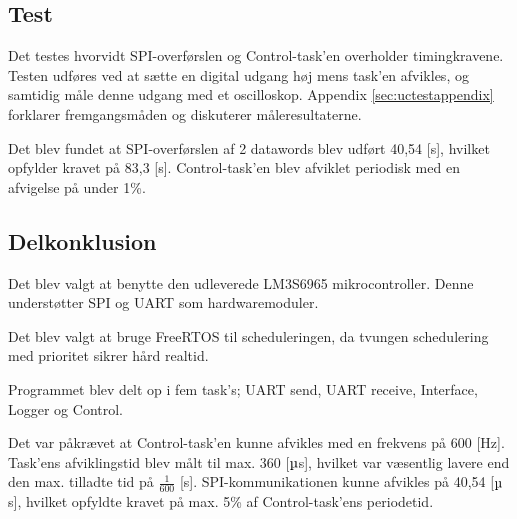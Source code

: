 
\subsection{Test} 
Det testes hvorvidt SPI-overførslen og Control-task'en overholder timingkravene. 
Testen udføres ved at sætte en digital udgang høj mens task'en afvikles, og samtidig måle denne udgang med et oscilloskop. 
Appendix \ref{sec:uctestappendix} forklarer fremgangsmåden og diskuterer måleresultaterne. 

Det blev fundet at SPI-overførslen af 2 datawords blev udført 40,54 [\micro s], hvilket opfylder kravet på 83,3 [\micro s]. 
Control-task'en blev afviklet periodisk med en afvigelse på under 1\%. 

\subsection{Delkonklusion}
Det blev valgt at benytte den udleverede LM3S6965 mikrocontroller.
Denne understøtter SPI og UART som hardwaremoduler. 

Det blev valgt at bruge FreeRTOS til scheduleringen,
da tvungen schedulering med prioritet sikrer hård realtid. 

Programmet blev delt op i fem task's; UART send, UART receive, Interface, Logger og Control. 

Det var påkrævet at Control-task'en kunne afvikles med en frekvens på 600 [Hz]. 
Task'ens afviklingstid blev målt til max. 360 [\(\micro\)s], hvilket var væsentlig lavere end den max. tilladte tid på \(\frac{1}{600}\) [s]. 
SPI-kommunikationen kunne afvikles på 40,54 [\(\micro\)s], hvilket opfyldte kravet på max. 5\% af Control-task'ens periodetid. 

